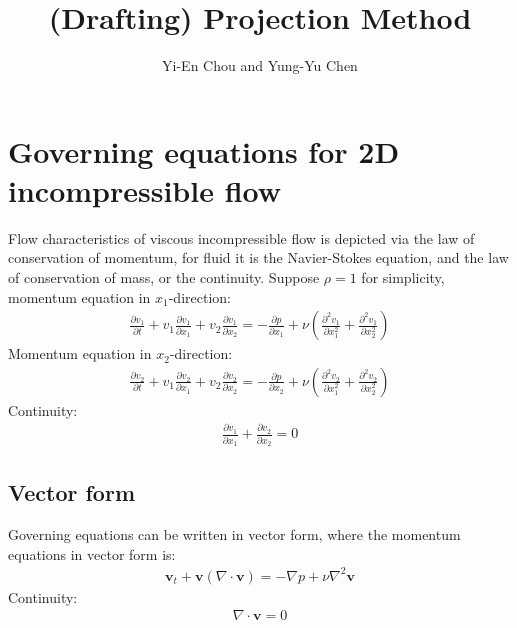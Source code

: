 \documentclass[11pt,dvips]{article}
\title{
%
(Drafting) Projection Method
%
}
\author{
%
Yi-En Chou and Yung-Yu Chen
%
}
\numberwithin{equation}{section}
\begin{document}
\maketitle

\begin{abstract}
%
%
\end{abstract}


\section{Governing equations for 2D incompressible flow}\label{s:projection}

Flow characteristics of viscous incompressible flow is depicted via the law of 
conservation of momentum, for fluid it is the Navier-Stokes equation, and the 
law of conservation of mass, or the continuity. Suppose $\rho=1$ for simplicity, 
momentum equation in $x_1$-direction:
%
\begin{align}
\frac{\partial v_1}{\partial t}+v_1 \frac{\partial v_1}{\partial x_1}+v_2 \frac{\partial v_1}
{\partial x_2}=-\frac{\partial p}{\partial x_1}+ \nu (\frac{\partial^2 v_1}{\partial x_1^2}
+\frac{\partial^2 v_1}{\partial x_2^2}) \label{e:x_momentum}
\end{align}
%
Momentum equation in $x_2$-direction:
%
\begin{align}
\frac{\partial v_2}{\partial t}+v_1 \frac{\partial v_2}{\partial x_1}+v_2 \frac{\partial v_2}
{\partial x_2}=-\frac{\partial p}{\partial x_2}+ \nu (\frac{\partial^2 v_2}{\partial x_1^2}
+\frac{\partial^2 v_2}{\partial x_2^2}) \label{e:y_momentum}
\end{align}
%
Continuity:  
%
\begin{align}
\frac{\partial v_1}{\partial x_1}+\frac{\partial v_2}{\partial x_2}=0 \label{e:continuity}
\end{align}
%
\subsection{Vector form}
Governing equations can be written in vector form, where the momentum equations 
in vector form is:
%
\begin{align}
\mathbf{v}_t+\mathbf{v}(\nabla \cdot \mathbf{v})=-\nabla p+\nu \nabla^2 \mathbf{v} 
\label{e:momentum_vec}
\end{align}
%
Continuity:
%
\begin{align}
\nabla \cdot \mathbf{v}=0 \label{e:continuity_vec}
\end{align}
%
\end{document}
